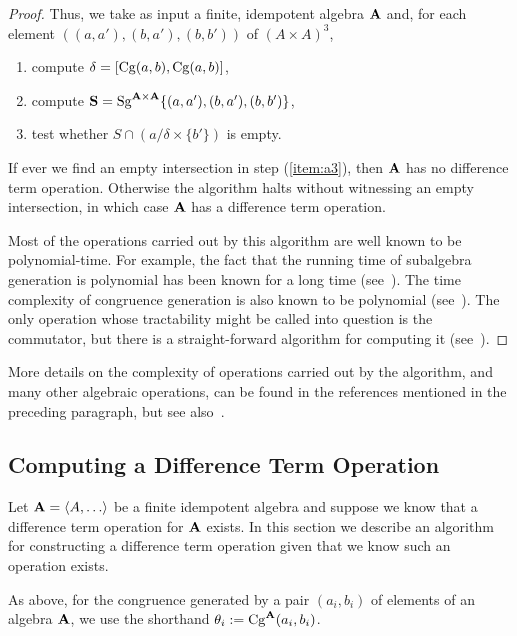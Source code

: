\begin{proof}
    Thus, we take as input a finite, idempotent algebra $\mathbf{A}$ and, 
    for each element $((a,a'), (b,a'), (b,b'))$ of $(A\times A)^3$,
    \begin{enumerate}
      \item compute $\delta = [\operatorname{Cg}(a,b), \operatorname{Cg}(a,b)]$, 
      \item compute $\mathbf{S} = \operatorname{Sg}^{\mathbf{A}\times \mathbf{A}}\{(a,a'), (b,a'), (b,b')\}$,
      \item \label{item:a3} test whether $S \cap (a/\delta \times \{b'\})$ is empty.
    \end{enumerate}
    If ever we find an empty intersection in step (\ref{item:a3}), then
    $\mathbf{A}$ has no difference term operation.
    Otherwise the algorithm halts without witnessing an empty
    intersection, in which case $\mathbf{A}$ has a difference term operation.

    Most of the operations carried out by this algorithm are well known to be
    polynomial-time.  For example, the fact that the running time of 
    subalgebra generation is polynomial has been known for a long time (see~\cite{MR0455543}).
    The time complexity of congruence generation is also known to be polynomial
    (see~\cite{MR2470585}).  The only operation whose tractability might be
    called into question is the commutator, but there is a straight-forward
    algorithm for computing it (see~\cite{2017arXiv170302764D}).
\end{proof}


More details on the complexity of operations carried out by the algorithm, and
many other algebraic operations, can be found in the references mentioned in the preceding paragraph, but see also~\cite{MR1871085,MR1695293,Freese:2009}.

\subsection{Computing a Difference Term Operation}
Let $\alg{A} = \<A, \dots\>$ be a finite idempotent algebra and suppose we 
know that a difference term operation for $\mathbf{A}$ exists.  In this section we
describe an algorithm for constructing a difference term operation given that 
we know such an operation exists.

As above, for the congruence generated by a pair $(a_i, b_i)$ 
of elements of an algebra $\mathbf{A}$, we use the shorthand
$\theta_i := \operatorname{Cg}^{\mathbf{A}}(a_i, b_i)$.

